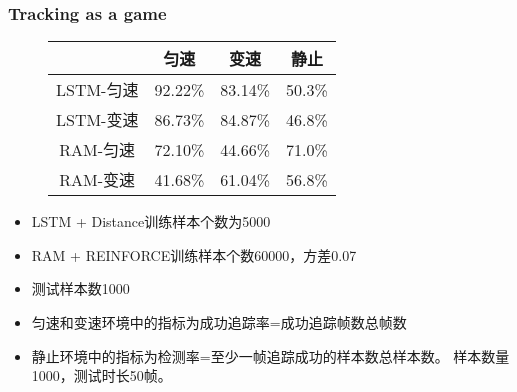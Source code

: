 \documentclass[10pt,CJK]{beamer}
\begin{document}
	\begin{frame}
		\frametitle{Tracking as a game}
		\begin{figure}
			\centering
			\begin{tabular}{|c|c|c|c|}
				\hline & 匀速 & 变速 & 静止 \\ 
				\hline LSTM-匀速 & 92.22\% & 83.14\% & 50.3\% \\ 
				\hline LSTM-变速 & 86.73\% & 84.87\% & 46.8\% \\ 
				\hline RAM-匀速 & 72.10\% & 44.66\% & 71.0\% \\ 
				\hline RAM-变速 & 41.68\% & 61.04\% & 56.8\% \\ 
				\hline 
			\end{tabular}
		\end{figure}
		\begin{itemize}
			\item LSTM + Distance训练样本个数为5000
			\item RAM + REINFORCE训练样本个数60000，方差0.07
			\item 测试样本数1000
			\item 匀速和变速环境中的指标为成功追踪率=成功追踪帧数\textdiv 总帧数
			\item 静止环境中的指标为检测率=至少一帧追踪成功的样本数\textdiv 总样本数。
			样本数量1000，测试时长50帧。
		\end{itemize}
	\end{frame}
	
\end{document}
